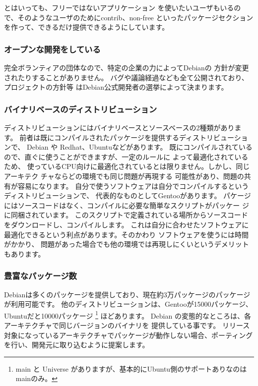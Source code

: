 \documentclass[mingoth,a4paper]{jsarticle}
\begin{document}
とはいっても、フリーではないアプリケーション
を使いたいユーザもいるので、そのようなユーザのためにcontrib、non-free 
といったパッケージセクションを作って、できるだけ提供できるようにしています。

\subsubsection{オープンな開発をしている}
完全ボランティアの団体なので、特定の企業の力によってDebianの
方針が変更されたりすることがありません。
バグや議論経過なども全て公開されており、プロジェクトの方針等
はDebian公式開発者の選挙によって決まります。

\subsubsection{バイナリベースのディストリビューション}
ディストリビューションにはバイナリベースとソースベースの2種類があります。
前者は既にコンパイルされたパッケージを提供するディストリビューションで、
Debian や Redhat、Ubuntuなどがあります。
既にコンパイルされているので、直ぐに使うことができますが、一定のルールに
よって最適化されているため、
使っているCPU向けに最適化されているとは限りません。しかし、同じアーキテク
チャならどの環境でも同じ問題が再現する
可能性があり、問題の共有が容易になります。
自分で使うソフトウェアは自分でコンパイルするというディストリビューションで、
代表的なものとしてGentooがあります。
パケージにはソースコードはなく、コンパイルに必要な簡単なスクリプトがパッケー
ジに同梱されています。
このスクリプトで定義されている場所からソースコードをダウンロードし、コンパイルします。
これは自分に合わせたソフトウェアに最適化できるという利点があります。そのかわり
ソフトウェアを使うには時間がかかり、
問題があった場合でも他の環境では再現しにくいというデメリットもあります。

\subsubsection{豊富なパッケージ数}

Debianは多くのパッケージを提供しており、現在約3万パッケージのパッケージが利用可能です。
他のディストリビューションは、Gentooが15000パッケージ、Ubuntuだと10000パッケージ
\footnote{main と Universe がありますが、基本的にUbuntu側のサポートありなのはmainのみ。} 
ほどあります。
Debian の変態的なところは、各アーキテクチャで同じバージョンのバイナリを
提供している事です。
リリース対象になっているアーキテクチャでパッケージが動作しない場合、ポーティング
を行い、開発元に取り込むように提案します。
\end{document}
